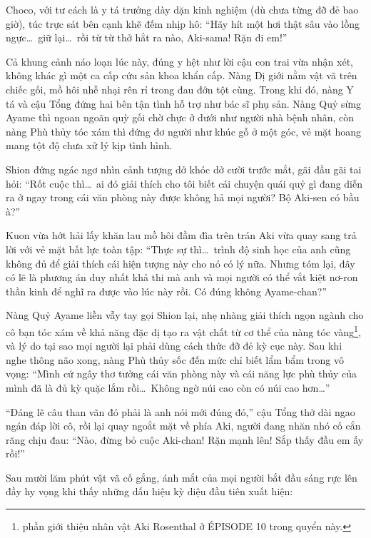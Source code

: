 \documentclass[../main.tex]{subfiles}
\begin{document}
Choco, với tư cách là y tá trưởng dày dặn kinh nghiệm (dù chưa từng đỡ đẻ bao giờ), túc trực sát bên cạnh khẽ đếm nhịp hô:
``Hãy hít một hơi thật sâu vào lồng ngực\dots\ giữ lại\dots\ rồi từ từ thở hắt ra nào, Aki-sama! Rặn đi em!''


Cả khung cảnh náo loạn lúc này, đúng y hệt như lời cậu con trai vừa nhận xét, không khác gì một ca cấp cứu sản khoa khẩn cấp. Nàng Dị giới nằm vật vã trên chiếc gối, mồ hôi nhễ nhại rên rỉ trong đau đớn tột cùng. Trong khi đó, nàng Y tá và cậu Tổng đứng hai bên tận tình hỗ trợ như bác sĩ phụ sản. Nàng Quỷ sừng Ayame thì ngoan ngoãn quỳ gối chờ chực ở dưới như người nhà bệnh nhân, còn nàng Phù thủy tóc xám thì đứng đơ người như khúc gỗ ở một góc, vẻ mặt hoang mang tột độ chưa xử lý kịp tình hình.

Shion đứng ngác ngơ nhìn cảnh tượng dở khóc dở cười trước mắt, gãi đầu gãi tai hỏi: ``Rốt cuộc thì\dots\ ai đó giải thích cho tôi biết cái chuyện quái quỷ gì đang diễn ra ở ngay trong cái văn phòng này được không hả mọi người? Bộ Aki-sen có bầu à?''

Kuon vừa hớt hải lấy khăn lau mồ hôi đầm đìa trên trán Aki vừa quay sang trả lời với vẻ mặt bất lực toàn tập: ``Thực sự thì\dots\ trình độ sinh học của anh cũng không đủ để giải thích cái hiện tượng này cho nó có lý nữa. Nhưng tóm lại, đây có lẽ là phương án duy nhất khả thi mà anh và mọi người có thể vắt kiệt nơ-ron thần kinh để nghĩ ra được vào lúc này rồi. Có đúng không Ayame-chan?''

Nàng Quỷ Ayame liền vẫy tay gọi Shion lại, nhẹ nhàng giải thích ngọn ngành cho cô bạn tóc xám về khả năng đặc dị tạo ra vật chất từ cơ thể của nàng tóc vàng\footnote{phần giới thiệu nhân vật Aki Rosenthal ở {\flaregothic ÉPISODE 10} trong quyển này.}, và lý do tại sao mọi người lại phải dùng cách thức đỡ đẻ kỳ cục này. Sau khi nghe thông não xong, nàng Phù thủy sốc đến mức chỉ biết lẩm bẩm trong vô vọng:
``Mình cứ ngây thơ tưởng cái văn phòng này và cái năng lực phù thủy của mình đã là đủ kỳ quặc lắm rồi\dots\ Không ngờ núi cao còn có núi cao hơn\dots''

``Đáng lẽ câu than vãn đó phải là anh nói mới đúng đó,'' cậu Tổng thở dài ngao ngán đáp lời cô, rồi lại quay ngoắt mặt về phía Aki, người đang nhăn nhó cố cắn răng chịu đau: ``Nào, đừng bỏ cuộc Aki-chan! Rặn mạnh lên! Sắp thấy đầu em ấy rồi!''

Sau mười lăm phút vật vã cố gắng, ánh mắt của mọi người bắt đầu sáng rực lên đầy hy vọng khi thấy những dấu hiệu kỳ diệu đầu tiên xuất hiện:
\end{document}
